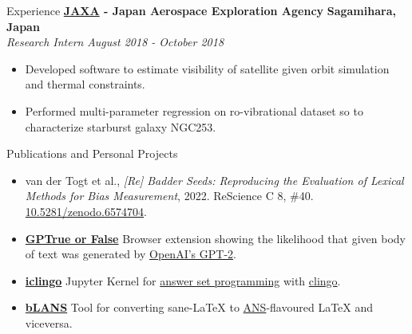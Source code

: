 \documentclass{resume} %
\begin{document}
\begin{rSection}{Experience}
	{\bf \href{https://global.jaxa.jp/}{JAXA} -  Japan Aerospace Exploration Agency} \hfill \textbf{Sagamihara, Japan}
	\\ \textit{Research Intern} \hfill {\em August 2018 - October 2018}
	\begin{itemize}\vspace{-0.5em}
		\item Developed software to estimate visibility of satellite given orbit simulation and thermal
		      constraints.
		\item Performed multi-parameter regression on ro-vibrational dataset so to characterize
		      starburst galaxy NGC253.
	\end{itemize}
\end{rSection}

\begin{rSection}{Publications and Personal Projects}

	\begin{itemize}
		\item van der Togt et al., \textit{[Re] Badder Seeds: Reproducing the Evaluation of Lexical
			      Methods for Bias Measurement}, 2022. ReScience C 8,
		      \#40. \href{https://doi.org/10.5281/zenodo.6574704}{10.5281/zenodo.6574704}.
		\item
		      {\bf \href{https://www.giuliostarace.com/projects/gptrue-or-false/}{GPTrue or False}}
		      Browser extension showing the likelihood that given body of text was generated by
		      \href{https://openai.com/blog/better-language-models/}{OpenAI's GPT-2}.
		\item
		      {\bf \href{https://github.com/thesofakillers/iclingo}{iclingo}}
		      Jupyter Kernel for \href{https://en.wikipedia.org/wiki/Answer_set_programming}{answer set
			      programming}  with \href{https://potassco.org/clingo/}{clingo}.
		\item
		      {\bf \href{https://github.com/thesofakillers/bLANS}{bLANS}} Tool for converting sane-LaTeX
		      to \href{https://ans.app/}{ANS}-flavoured LaTeX and viceversa.
	\end{itemize}
\end{rSection}
\end{document}
